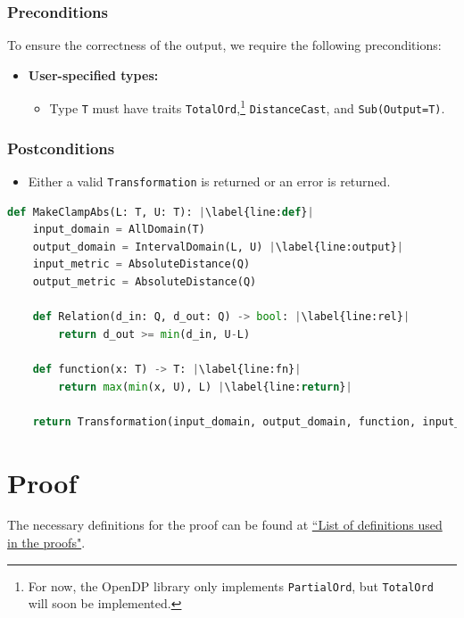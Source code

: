 \documentclass[11pt,a4paper]{article}
\theoremstyle{definition}
\begin{document}
\subsubsection*{Preconditions}
To ensure the correctness of the output, we require the following preconditions:

\begin{itemize}
    \item \textbf{User-specified types:}
    \begin{itemize}
        \item Type \texttt{T} must have traits \texttt{TotalOrd},\footnote{For now, the OpenDP library only implements \texttt{PartialOrd}, but \texttt{TotalOrd} will soon be implemented.} \texttt{DistanceCast}, and \texttt{Sub(Output=T)}.
    \end{itemize}
\end{itemize}

\subsubsection*{Postconditions}
\begin{itemize}
    \item Either a valid \texttt{Transformation} is returned or an error is returned.
\end{itemize}

\begin{lstlisting}[language=Python, escapechar=|] 
def MakeClampAbs(L: T, U: T): |\label{line:def}|
    input_domain = AllDomain(T)
    output_domain = IntervalDomain(L, U) |\label{line:output}|
    input_metric = AbsoluteDistance(Q)
    output_metric = AbsoluteDistance(Q)
    
    def Relation(d_in: Q, d_out: Q) -> bool: |\label{line:rel}|
        return d_out >= min(d_in, U-L)
        
    def function(x: T) -> T: |\label{line:fn}|
        return max(min(x, U), L) |\label{line:return}|
    
    return Transformation(input_domain, output_domain, function, input_metric, output_metric, stability_relation = Relation)
\end{lstlisting}

\section{Proof}
The necessary definitions for the proof can be found at \href{https://www.overleaf.com/project/60d214e390b337703d200982}{``List of definitions used in the proofs"}.
\end{document}
